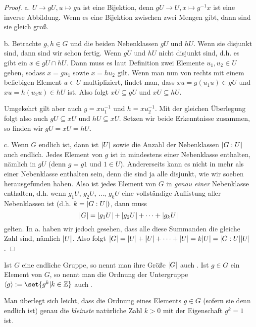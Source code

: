 \begin{proof}
a. $U\to gU, u\mapsto gu$ ist eine Bijektion, denn $gU\to U, x\mapsto g^{-1} x$ ist eine inverse Abbildung. Wenn es eine Bijektion zwischen zwei Mengen gibt, dann sind sie gleich groß.

\medbreak
b. Betrachte $g,h\in G$ und die beiden Nebenklassen $gU$ und $hU$. Wenn sie disjunkt sind, dann sind wir schon fertig. Wenn $gU$ und $hU$ nicht disjunkt sind, d.h. es gibt ein $x\in gU\cap hU$. Dann muss es laut Definition zwei Elemente $u_1,u_2\in U$ geben, sodass $x=gu_1$ sowie $x=hu_2$ gilt. Wenn man nun von rechts mit einem beliebigen Element $u\in U$ multipliziert, findet man, dass $xu = g(u_1 u)\in gU$ und $xu=h(u_2 u)\in hU$ ist. Also folgt $xU\subseteq gU$ und $xU\subseteq hU$.

Umgekehrt gilt aber auch $g=xu_1^{-1}$ und $h=xu_2^{-1}$. Mit der gleichen Überlegung folgt also auch $gU\subseteq xU$ und $hU\subseteq xU$. Setzen wir beide Erkenntnisse zusammen, so finden wir $gU=xU=hU$.

\medbreak
c. Wenn $G$ endlich ist, dann ist $\lvert U\rvert$ sowie die Anzahl der Nebenklassen $\lvert G:U\rvert$ auch endlich. Jedes Element von $g$ ist in mindestens einer Nebenklasse enthalten, nämlich in $gU$ (denn $g=g1$ und $1\in U$). Andererseits kann es nicht in mehr als einer Nebenklasse enthalten sein, denn die sind ja alle disjunkt, wie wir soeben herausgefunden haben. Also ist jedes Element von $G$ in \emph{genau einer} Nebenklasse enthalten, d.h. wenn $g_1 U$, $g_2 U$, ..., $g_k U$ eine vollständige Auflistung aller Nebenklassen ist (d.h. $k=\lvert G:U\rvert)$, dann muss
\[\lvert G\rvert = \lvert g_1 U\rvert + \lvert g_2 U\rvert + \cdots + \lvert g_k U\rvert\]
gelten. In a. haben wir jedoch gesehen, dass alle diese Summanden die gleiche Zahl sind, nämlich $\lvert U\rvert$. Also folgt $\lvert G\rvert=\lvert U\rvert+\lvert U\rvert+\cdots+\lvert U\rvert = k\lvert U\rvert = \lvert G:U\rvert\lvert U\rvert$.
\end{proof}

\begin{definition}
Ist $G$ eine endliche Gruppe, so nennt man ihre Größe $\lvert G\rvert$ auch . Ist $g\in G$ ein Element von $G$, so nennt man die Ordnung der Untergruppe $\langle g\rangle:=\set{g^k | k\in\IZ}$ auch .
\end{definition}

\begin{remark}
Man überlegt sich leicht, dass die Ordnung eines Elements $g\in G$ (sofern sie denn endlich ist) genau die \emph{kleinste} natürliche Zahl $k>0$ mit der Eigenschaft $g^k=1$ ist.
\end{remark}

